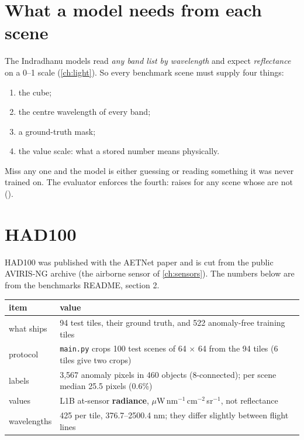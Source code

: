 \section{What a model needs from each scene}\label{sec:benchmarks:needs}

The Indradhanu models read \emph{any band list by wavelength} and expect \emph{reflectance} on a 0--1 scale
(\cref{ch:light}). So every benchmark scene must supply four things:
\begin{enumerate}
\item the cube;
\item the centre wavelength of every band;
\item a ground-truth mask;
\item the value scale: what a stored number means physically.
\end{enumerate}
Miss any one and the model is either guessing or reading something it was never trained on. The evaluator enforces
the fourth:  raises  for any scene whose  are not
 ().

\section{HAD100}\label{sec:benchmarks:had}

HAD100 was published with the AETNet paper \citep{li2023you} and is cut from the public AVIRIS-NG archive (the
airborne sensor of \cref{ch:sensors}). The numbers below are from the benchmarks README, section 2\hfil{}\hfilneg{}.

\begin{center}
\small
\begin{tabular}{p{2.8cm}p{9.6cm}}
\toprule
item & value \\
\midrule
what ships & 94 test tiles, their ground truth, and 522 anomaly-free training tiles \\
protocol & \texttt{main.py} crops 100 test scenes of 64 $\times$ 64 from the 94 tiles (6 tiles give two crops) \\
labels & 3,567 anomaly pixels in 460 objects (8-connected); per scene median 25.5 pixels (0.6\%) \\
values & L1B at-sensor \textbf{radiance}, $\mu$W\,nm$^{-1}$\,cm$^{-2}$\,sr$^{-1}$, not reflectance \\
wavelengths & 425 per tile, 376.7--2500.4 nm; they differ slightly between flight lines \\
\bottomrule
\end{tabular}
\end{center}

